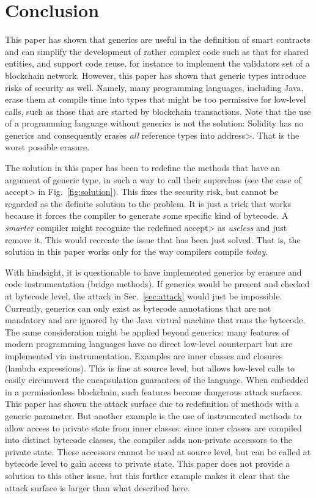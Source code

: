 \section{Conclusion}\label{sec:conclusion} 

This paper has shown that generics are useful in the definition
of smart contracts and can simplify the development of rather complex
code such as that for shared entities, and support code reuse, for
instance to implement the validators set of a blockchain network.
However, this paper has shown that generic types
introduce risks of security as well.
Namely, many
programming languages, including Java, erase them at compile time
into types that might be too permissive for low-level calls, such as
those that are started by blockchain transactions. Note that the use of a programming
language without generics is not the solution: Solidity has no generics
and consequently erases \emph{all} reference types into \<address>.
That is the worst possible erasure.

The solution in this paper has been to redefine the methods that have an argument
of generic type, in such a way to call their superclass
(see the case of \<accept> in Fig.~\ref{fig:solution}). This fixes the security risk,
but cannot be regarded as the definite solution to the problem. It is just a trick that
works because it forces the compiler to generate some specific kind of bytecode.
A \emph{smarter} compiler might recognize the redefined \<accept> as
\emph{useless} and just remove it. This would recreate the issue that
has been just solved. That is, the solution in this paper works only for the way
compilers compile \emph{today}.

With hindsight, it is questionable to have implemented generics by erasure
and code instrumentation (bridge methods). If generics would be present
and checked at bytecode level, the attack in Sec.~\ref{sec:attack} would just
be impossible. Currently, generics can only exist as bytecode annotations
that are not mandatory and are ignored by the Java virtual machine
that runs the bytecode. The same consideration might be applied beyond
generics: many features of modern programming
languages have no direct low-level
counterpart but are implemented via instrumentation. Examples are
inner classes and closures (lambda expressions). This is fine at source level, but allows
low-level calls to easily circumvent
the encapsulation guarantees of the language. When embedded in a permissionless
blockchain, such features become dangerous attack surfaces. This paper has shown
the attack surface due to redefinition of methods with a generic parameter.
But another example is the use of instrumented methods to allow access to
private state from inner classes: since inner classes are compiled into distinct
bytecode classes, the compiler adds non-private accessors to the
private state. These accessors cannot be used
at source level, but can be called at bytecode level to gain access to private state.
This paper does not provide a solution to this other issue, but this further example
makes it clear that the attack surface is larger than what described here.

